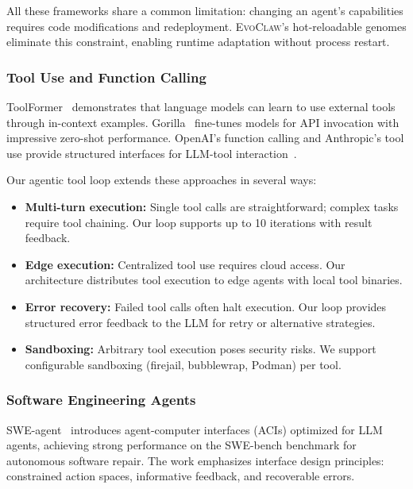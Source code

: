 \documentclass{article}
\newcommand{\evoclaw}{\textsc{EvoClaw}}
\begin{document}
All these frameworks share a common limitation: changing an agent's capabilities requires code modifications and redeployment. \evoclaw{}'s hot-reloadable genomes eliminate this constraint, enabling runtime adaptation without process restart.

\subsubsection{Tool Use and Function Calling}

ToolFormer~\cite{schick2023toolformer} demonstrates that language models can learn to use external tools through in-context examples. Gorilla~\cite{parisi2023gorilla} fine-tunes models for API invocation with impressive zero-shot performance. OpenAI's function calling and Anthropic's tool use provide structured interfaces for LLM-tool interaction~\cite{openai2023function}.

Our agentic tool loop extends these approaches in several ways:

\begin{itemize}[leftmargin=*]
    \item \textbf{Multi-turn execution:} Single tool calls are straightforward; complex tasks require tool chaining. Our loop supports up to 10 iterations with result feedback.
    
    \item \textbf{Edge execution:} Centralized tool use requires cloud access. Our architecture distributes tool execution to edge agents with local tool binaries.
    
    \item \textbf{Error recovery:} Failed tool calls often halt execution. Our loop provides structured error feedback to the LLM for retry or alternative strategies.
    
    \item \textbf{Sandboxing:} Arbitrary tool execution poses security risks. We support configurable sandboxing (firejail, bubblewrap, Podman) per tool.
\end{itemize}

\subsubsection{Software Engineering Agents}

SWE-agent~\cite{yang2024sweagent} introduces agent-computer interfaces (ACIs) optimized for LLM agents, achieving strong performance on the SWE-bench benchmark for autonomous software repair. The work emphasizes interface design principles: constrained action spaces, informative feedback, and recoverable errors.
\end{document}
